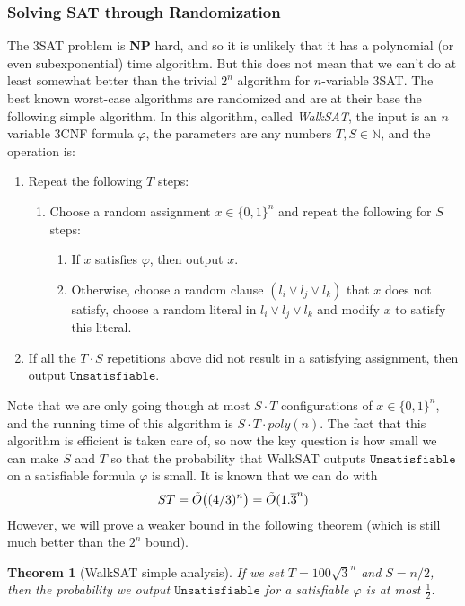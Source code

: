 \documentclass[a4paper, 12pt]{report}
\newtheorem{theorem}{Theorem}[section]
\theoremstyle{remark}
\theoremstyle{definition}
\begin{document}
\subsubsection{Solving SAT through Randomization}
The 3SAT problem is \textbf{NP} hard, and so it is unlikely that it has a polynomial (or even subexponential) time algorithm. But this does not mean that we can't do at least somewhat better than the trivial $2^n$ algorithm for $n$-variable 3SAT. The best known worst-case algorithms are randomized and are at their base the following simple algorithm. In this algorithm, called \textit{WalkSAT}, the input is an $n$ variable 3CNF formula $\varphi$, the parameters are any numbers $T, S \in \mathbb{N}$, and the operation is: 
\begin{enumerate}
    \item Repeat the following $T$ steps: 
    \begin{enumerate}
        \item Choose a random assignment $x \in \{0,1\}^n$ and repeat the following for $S$ steps: 
        \begin{enumerate}
            \item If $x$ satisfies $\varphi$, then output $x$. 
            \item Otherwise, choose a random clause $(l_i \vee l_j \vee l_k)$ that $x$ does not satisfy, choose a random literal in $l_i \vee l_j \vee l_k$ and modify $x$ to satisfy this literal. 
        \end{enumerate}
    \end{enumerate}
    \item If all the $T \cdot S$ repetitions above did not result in a satisfying assignment, then output $\texttt{Unsatisfiable}$. 
\end{enumerate}
Note that we are only going though at most $S\cdot T$ configurations of $x \in \{0,1\}^n$, and the running time of this algorithm is $S \cdot T \cdot poly(n)$. The fact that this algorithm is efficient is taken care of, so now the key question is how small we can make $S$ and $T$ so that the probability that WalkSAT outputs $\texttt{Unsatisfiable}$ on a satisfiable formula $\varphi$ is small. It is known that we can do with 
\[ST = \Tilde{O} \big( (4/3)^n \big) = \Tilde{O} ( 1.\overline{3}^n)\]
However, we will prove a weaker bound in the following theorem (which is still much better than the $2^n$ bound). 

\begin{theorem}[WalkSAT simple analysis]
If we set $T = 100\sqrt{3}^n$ and $S = n/2$, then the probability we output $\texttt{Unsatisfiable}$ for a satisfiable $\varphi$ is at most $\frac{1}{2}$. 
\end{theorem}
\end{document}

